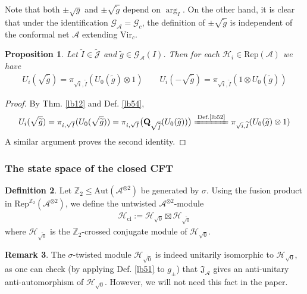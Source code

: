 \documentclass[11pt,b5paper,notitlepage]{article}
\theoremstyle{definition}
\newtheorem{df}{Definition}[section]
\newtheorem{rem}[df]{Remark}
\theoremstyle{plain}
\newtheorem{pp}[df]{Proposition}
\newcommand{\fk}{\mathfrak}
\newcommand{\wtd}{\widetilde}
\newcommand{\ovl}{\overline}
\newcommand{\Rep}{\mathrm{Rep}}
\newcommand{\Vir}{\mathrm{Vir}}
\newcommand{\GA}{\mathscr G_{\mathcal A}}
\newcommand{\Jtd}{\widetilde{\mathcal J}}
\newcommand{\RepA}{\mathrm{Rep}(\mathcal A)}
\newcommand{\Zbb}{\mathbb Z}
\newcommand{\Gc}{\mathscr G_c}
\newcommand{\Aut}{\mathrm{Aut}}
\newcommand{\MA}{\mathcal A}
\newcommand{\MH}{\mathcal H}
\newcommand{\Maa}{{\mathcal A^{\otimes 2}}}
\newcommand{\sqz}{{\sqrt 0}}
\newcommand{\MHcl}{\mathcal H_{\mathrm{cl}}}
\newcommand{\Qbf}{\mathbf Q}
\numberwithin{equation}{section}
\begin{document}
Note that both $\pm\sqrt g$ and $\pm\sqrt{\wtd g}$ depend on $\arg_I$. On the other hand, it is clear that under the identification $\GA=\Gc$, the definition of $\pm\sqrt{\wtd g}$ is independent of the conformal net $\MA$ extending $\Vir_c$.


\begin{pp}\label{lb66}
Let $\wtd I\in\Jtd$ and $\wtd g\in\GA(I)$. Then for each $\MH_i\in\RepA$ we have
\begin{align*}
U_i(\sqrt {\wtd g})=\pi_{\sqrt i,\wtd I}(U_0(\wtd g)\otimes 1)\qquad U_i(-\sqrt{\wtd g})=\pi_{\sqrt i,\wtd I}(1\otimes U_0(\wtd g))
\end{align*}
\end{pp}


\begin{proof}
By Thm. \ref{lb12} and Def. \ref{lb54},
\begin{align*}
U_i(\sqrt {\wtd g})=\pi_{i,\sqrt I}(U_0(\sqrt{\wtd g}))=\pi_{i,\sqrt I}\big(\Qbf_{\sqrt{\wtd I}}(U_0(\wtd g))\big)\xlongequal{\text{Def.\ref{lb52}}}\pi_{\sqrt i,\wtd I}(U_0(\wtd g)\otimes 1)
\end{align*}
A similar argument proves the second identity.
\end{proof}


\subsubsection{The state space of the closed CFT}



\begin{df}\label{lb155}
Let $\Zbb_2\leq\Aut(\Maa)$ be generated by $\sigma$. Using the fusion product in $\Rep^{\Zbb_2}(\Maa)$, we define the untwisted $\Maa$-module
\begin{align*}
\pmb{\MHcl}:=\MH_{\sqz}\boxtimes\MH_{\ovl\sqz}
\end{align*}
where $\MH_{\ovl\sqz}$ is the $\Zbb_2$-crossed conjugate module of $\MH_\sqz$.
\end{df}

\begin{rem}
The $\sigma$-twisted module $\MH_{\ovl\sqz}$ is indeed unitarily isomorphic to $\MH_\sqz$, as one can check (by applying Def. \ref{lb51} to $g_\pm$) that $\fk J_\MA$ gives an anti-unitary anti-automorphism of $\MH_\sqz$. However, we will not need this fact in the paper.
\end{rem}
\end{document}
